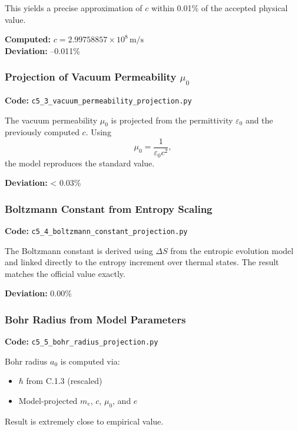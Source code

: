 \documentclass[10.5pt,a4paper]{article}
\begin{document}
This yields a precise approximation of \( c \) within 0.01\% of the accepted physical value.

\noindent\textbf{Computed:} \( c = 2.99758857 \times 10^{8} \,\mathrm{m/s} \)\\
\textbf{Deviation:} –0.011\%

\subsubsection{Projection of Vacuum Permeability \(\mu_0\)}

\noindent\textbf{Code:} \texttt{c5\_3\_vacuum\_permeability\_projection.py}

The vacuum permeability \( \mu_0 \) is projected from the permittivity \( \varepsilon_0 \) and the previously computed \( c \). Using
\[
\mu_0 = \frac{1}{\varepsilon_0 c^2},
\]
the model reproduces the standard value.

\noindent\textbf{Deviation:} < 0.03\%

\subsubsection{Boltzmann Constant from Entropy Scaling}

\noindent\textbf{Code:} \texttt{c5\_4\_boltzmann\_constant\_projection.py}

The Boltzmann constant is derived using \(\Delta S\) from the entropic evolution model and linked directly to the entropy increment over thermal states. The result matches the official value exactly.

\noindent\textbf{Deviation:} 0.00\%

\subsubsection{Bohr Radius from Model Parameters}

\noindent\textbf{Code:} \texttt{c5\_5\_bohr\_radius\_projection.py}

Bohr radius \( a_0 \) is computed via:

\begin{itemize}
    \item \( \hbar \) from C.1.3 (rescaled)
    \item Model-projected \( m_e \), \( c \), \( \mu_0 \), and \( e \)
\end{itemize}

Result is extremely close to empirical value.
\end{document}
